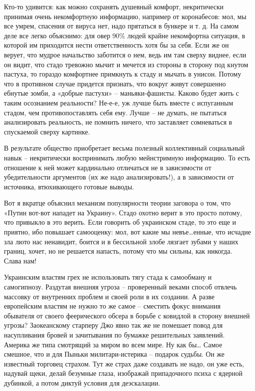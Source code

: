 Кто-то удивится: как можно сохранять душевный комфорт, некритически принимая
очень некомфортную информацию, например от коронабесов: мол, мы все умрем,
спасения от вируса нет, надо прятаться в бункере и т. д. На самом деле все
легко объяснимо: для овер 90\% людей крайне некомфортна ситуация, в которой им
приходится нести ответственность хотя бы за себя. Если же он верует, что мудрое
начальство заботится о нем, ведь им там сверху виднее, если он видит, что стадо
тревожно мычит и мечется из стороны в сторону под кнутом пастуха, то гораздо
комфортнее примкнуть к стаду и мычать в унисон. Потому что в противном случае
придется признать, что вокруг живут совершенно ебнутые зомби, а «добрые
пастухи» – маньяки-фашисты. Каково будет жить с таким осознанием реальности?
Не-е-е, уж лучше быть вместе с испуганным стадом, чем противопоставлять себя
ему. Лучше – не думать, не пытаться анализировать реальность, не помнить
ничего, что заставляет сомневаться в спускаемой сверху картинке.

В результате общество приобретает весьма полезный коллективный социальный навык
– некритически воспринимать любую мейнстримную информацию. То есть отношение к
ней может кардинально отличаться не в зависимости от убедительности аргументов
(их же надо анализировать!), а в зависимости от источника, втюхивающего готовые
выводы.

Вот я вкратце объяснил механизм популярности теории заговора о том, что «Путин
вот-вот нападет на Украину». Стадо охотно верит в это просто потому, что
привыкло в это верить. Если говорить об украинском стаде, то это еще и приятно,
ибо повышает самооценку: мол, вот какие мы невъе…енные, что исчадие зла люто
нас ненавидит, боится и в бессильной злобе лязгает зубами у наших границ,
хочет, но не решается напасть, потому что мы сильны, как никогда. Слава нам!

Украинским властям грех не использовать тягу стада к самообману и самогипнозу.
Раздутая внешняя угроза – проверенный веками способ отвлечь массовку от
внутренних проблем и своей роли в их создании. А разве европейским властям не
нужно то же самое – сместить фокус внимания обывателя от своего феерического
обсера в борьбе с ковидлой в сторону внешней угрозы? Заокеанскому старперу Джо
явно так же не помешает повод для насупливания бровей и зачитывания по бумажке
решительных заявлений. Америка же типа смотрящий за миром во всем мире. Ну как
бы… Самое смешное, что и для Пыньки  милитари-истерика – подарок судьбы. Он же
известный торговец страхом. Тут же страх даже создавать не надо, он уже есть,
надувай щеки, делай безумные глаза, изображай припадочного психа с ядерной
дубинкой, а потом диктуй условия для деэскалации.

